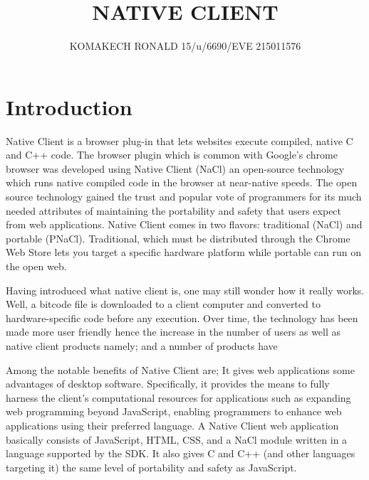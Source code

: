 \documentclass {article}
\begin{document}
\title{ NATIVE CLIENT}
\author{KOMAKECH RONALD 15/u/6690/EVE 215011576}

\maketitle

\section{Introduction}
Native Client is a browser plug-in that lets websites execute compiled, native C and C++ code. The browser plugin which is common with Google’s chrome browser was developed using Native Client (NaCl) an open-source technology which runs native compiled code in the browser at near-native speeds. The open source technology gained the trust and popular vote of programmers for its much needed attributes of maintaining the portability and safety that users expect from web applications. Native Client comes in two flavors: traditional (NaCl) and portable (PNaCl). Traditional, which must be distributed through the Chrome Web Store lets you target a specific hardware platform while portable can run on the open web. 
\par
Having introduced what native client is, one may still wonder how it really works. Well, a bitcode file is downloaded to a client computer and converted to hardware-specific code before any execution. Over time, the technology has been made more user friendly hence the increase in the number of users as well as native client products namely; and a number of products have 

\par
Among the notable benefits of Native Client are;
It gives web applications some advantages of desktop software. Specifically, it provides the means to fully harness the client’s computational resources for applications such as expanding web programming beyond JavaScript, enabling programmers to enhance web applications using their preferred language. A Native Client web application basically consists of JavaScript, HTML, CSS, and a NaCl module written in a language supported by the SDK.
It also gives C and C++ (and other languages targeting it) the same level of portability and safety as JavaScript.



\nocite{*}


\end{document}
